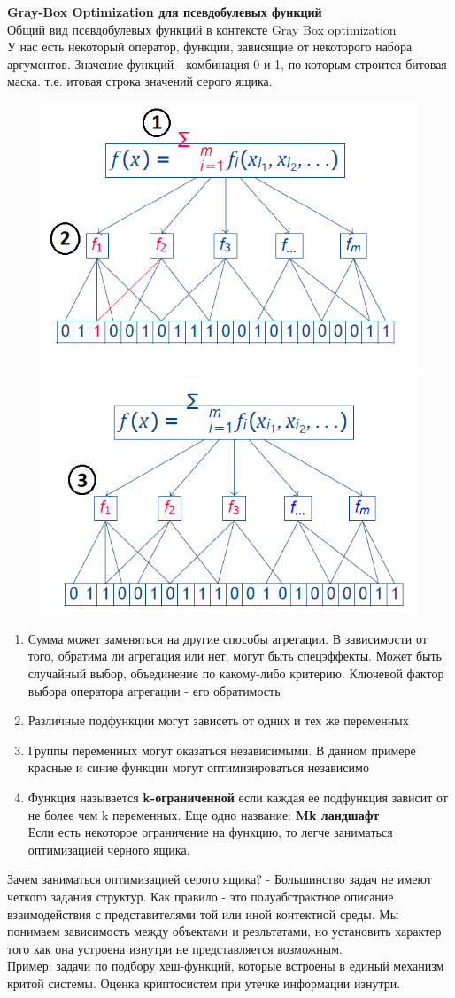 \textbf{Gray-Box Optimization для псевдобулевых функций}\\
Общий вид псевдобулевых функций в контексте Gray Box optimization\\
У нас есть некоторый оператор, функции, зависящие от некоторого набора аргументов. Значение функций - комбинация 0 и 1, по которым строится битовая маска. т.е. итовая строка значений серого ящика.
\begin{figure}[h]
\centering
\includegraphics[width=0.45\linewidth]{images/colorbox3.PNG}
\includegraphics[width=0.45\linewidth]{images/colorbox4.PNG}
\end{figure}
\begin{enumerate}
    \item Сумма может заменяться на другие способы агрегации. В зависимости от того, обратима ли агрегация или нет, могут быть спецэффекты. Может быть случайный выбор, объединение по какому-либо критерию. Ключевой фактор выбора оператора агрегации - его обратимость
    \item Различные подфункции могут зависеть от одних и тех же переменных
    \item Группы переменных могут оказаться независимыми. В данном примере красные и синие функции могут оптимизироваться независимо\\
    \item Функция называется \textbf{k-ограниченной} если каждая ее подфункция зависит от не более чем k переменных. Еще одно название:\textbf{ Mk ландшафт}\\ Если есть некоторое ограничение на функцию, то легче заниматься оптимизацией черного ящика.
\end{enumerate}
Зачем заниматься оптимизацией серого ящика? - Большинство задач не имеют четкого задания структур. Как правило - это полуабстрактное описание взаимодействия с представителями той или иной контектной среды. Мы понимаем зависимость между объектами и резльтатами, но установить характер того как она устроена изнутри не представляется возможным. \\
Пример: задачи по подбору хеш-функций, которые встроены в единый механизм критой системы. Оценка криптосистем при утечке информации изнутри.
